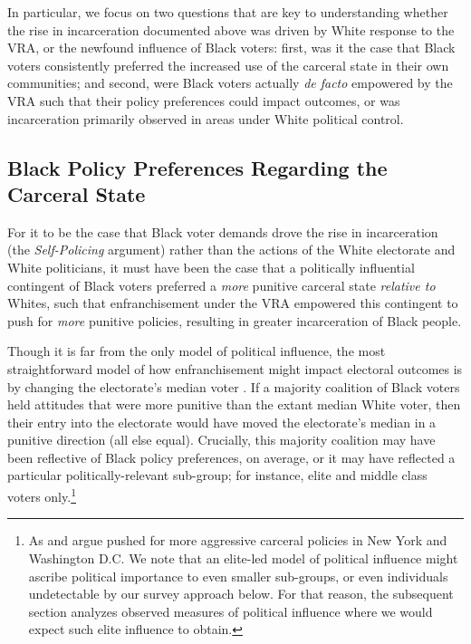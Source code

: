 \documentclass[12pt]{article}
\begin{document}
In particular, we focus on two questions that are key to understanding whether the rise in incarceration documented above was driven by White response to the VRA, or the newfound influence of Black voters: first, was it the case that Black voters consistently preferred the increased use of the carceral state in their own communities; and second, were Black voters actually \emph{de facto} empowered by the VRA such that their policy preferences could impact outcomes, or was incarceration primarily observed in areas under White political control.


\subsection*{Black Policy Preferences Regarding the Carceral State}

For it to be the case that Black voter demands drove the rise in incarceration (the \emph{Self-Policing} argument) rather than the actions of the White electorate and White politicians, it must have been the case that a politically influential contingent of Black voters preferred a \emph{more} punitive carceral state \emph{relative to} Whites, such that enfranchisement under the VRA empowered this contingent to push for \emph{more} punitive policies, resulting in greater incarceration of Black people.

Though it is far from the only model of political influence, the most straightforward model of how enfranchisement might impact electoral outcomes is by changing the electorate's median voter \citep{Downs:1957vg}.  If a majority coalition of Black voters held attitudes that were more punitive than the extant median White voter, then their entry into the electorate would have moved the electorate's median in a punitive direction (all else equal).  Crucially, this majority coalition may have been reflective of Black policy preferences, on average, or it may have reflected a particular politically-relevant sub-group; for instance, elite and middle class voters only.\footnote{As \cite{Fortner:2015uz} and \cite{FormanJr:2017tz} argue pushed for more aggressive carceral policies in New York and Washington D.C.  We note that an elite-led model of political influence might ascribe political importance to even smaller sub-groups, or even individuals undetectable by our survey approach below.  For that reason, the subsequent section analyzes observed measures of political influence where we would expect such elite influence to obtain.}
\end{document}
